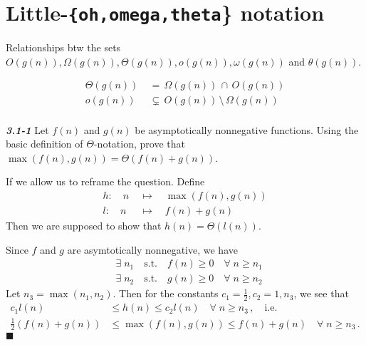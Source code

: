 \documentclass{article}
\begin{document}
\section{Little-\texttt{\{oh,omega,theta}\} notation}
Relationships btw the sets $O(g(n)), \Omega(g(n)), \Theta(g(n)), o(g(n)), \omega(g(n))$ and $\theta(g(n)).$

  \begin{align*}
    \Theta(g(n))\; &=\, \Omega(g(n)) \,\cap\, O(g(n)) \\
    o(g(n)) &\subsetneq\, O(g(n)) \,\setminus\, \Omega\left(g(n)\right) \\
  \end{align*}


\noindent
\textbf{\textsl{3.1-1}}
Let $f(n)$ and $g(n)$ be asymptotically nonnegative functions. Using the basic definition of $\Theta$-notation,
prove that $\max\left(f(n), g(n)\right) = \Theta(f(n) + g(n))$.
\newline
\newline

If we allow us to reframe the question. Define
\begin{align*}
	h \!:\quad n \;&\mapsto\quad \max(f(n), g(n)) \\
	l \!:\quad n \;&\mapsto\quad f(n) + g(n)
\end{align*}
Then we are supposed to show that $h(n) = \Theta(l(n))$.

\noindent
Since $f$ and $g$ are asymtotically nonnegative, we have
\begin{align*}
	& \exists\; n_1 \quad\textrm{s.t.}\quad f(n) \ge 0 \quad\forall\; n \ge n_1 \\
	& \exists\; n_2 \quad\textrm{s.t.}\quad g(n) \ge 0 \quad\forall\; n \ge n_2
\end{align*}
Let $n_3 = \max(n_1, n_2)$. Then for the constants $c_1=\frac{1}{2}, c_2=1, n_3$, we see that
\begin{align*}
	c_1 l(n) &\le h(n) \le c_2 l(n) \quad\forall\; n \ge n_3\,, \quad \textrm{i.e.}\\
	\frac{1}{2}(f(n) + g(n)) &\le \max\left(f(n), g(n)\right) \le f(n) + g(n) \quad\forall\; n \ge n_3\,.
\end{align*}
\hfill$\blacksquare$
\end{document}
